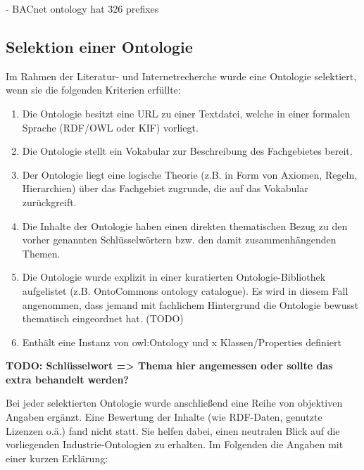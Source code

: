 \documentclass{article}
\begin{document}
- BACnet ontology hat 326 prefixes


\subsection{Selektion einer Ontologie}

Im Rahmen der Literatur- und Internetrecherche wurde eine Ontologie selektiert, wenn sie die folgenden Kriterien erfüllte:

\begin{enumerate}
    \item Die Ontologie besitzt eine URL zu einer Textdatei, welche in einer formalen Sprache (RDF/OWL oder KIF) vorliegt.
    \item Die Ontologie stellt ein Vokabular zur Beschreibung des Fachgebietes bereit.
    \item Der Ontologie liegt eine logische Theorie (z.B. in Form von Axiomen, Regeln, Hierarchien) über das Fachgebiet zugrunde, die auf das Vokabular zurückgreift.
    \item Die Inhalte der Ontologie haben einen direkten thematischen Bezug zu den vorher genannten Schlüsselwörtern bzw. den damit zusammenhängenden Themen.
    \item Die Ontologie wurde explizit in einer kuratierten Ontologie-Bibliothek aufgelistet (z.B. OntoCommons ontology catalogue). Es wird in diesem Fall angenommen, dass jemand mit fachlichem Hintergrund die Ontologie bewusst thematisch eingeordnet hat. (TODO)
    \item Enthält eine Instanz von owl:Ontology und x Klassen/Properties definiert
\end{enumerate}

\textbf{TODO: Schlüsselwort => Thema hier angemessen oder sollte das extra behandelt werden?}

Bei jeder selektierten Ontologie wurde anschließend eine Reihe von objektiven Angaben ergänzt.
Eine Bewertung der Inhalte (wie RDF-Daten, genutzte Lizenzen o.ä.) fand nicht statt.
Sie helfen dabei, einen neutralen Blick auf die vorliegenden Industrie-Ontologien zu erhalten.
Im Folgenden die Angaben mit einer kurzen Erklärung:
\end{document}
